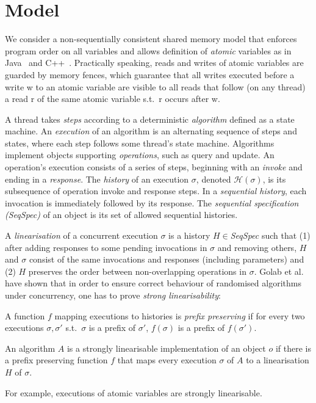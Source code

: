 \section{Model}
\label{sec:model}

We consider a non-sequentially consistent shared memory model that enforces program order on all variables and allows
definition of \emph{atomic} variables as in Java~\cite{JavaMemoryModel} and C++~\cite{CppConcurrentMemoryModel}.
Practically speaking, reads and writes of atomic variables are guarded by memory fences, which guarantee
that all writes executed before a write {\sc w} to an atomic variable are visible to all
reads that follow (on any thread) a read {\sc r} of the same atomic variable s.t.\ {\sc r} occurs after {\sc w}. 

A thread takes \emph{steps} according to a deterministic \emph{algorithm} defined as a state machine. 
An \emph{execution} of an algorithm is an alternating sequence of steps and states, 
where  each step follows some thread's state machine.
Algorithms implement objects supporting \emph{operations}, such as query and update. 
An operation's execution consists of a series of steps, beginning with an \emph{invoke} and ending in a \emph{response}. 
The \emph{history} of an execution $\sigma$, denoted ${\mathcal{H}}(\sigma)$, 
is its subsequence of operation invoke and response steps.
In a \emph{sequential history}, each invocation is immediately followed by its response.
The \emph{sequential specification (SeqSpec)} of an object is its set of allowed sequential histories.

A \emph{linearisation} of a concurrent execution $\sigma$ is a history $H \in$\emph{SeqSpec}
such that (1) after adding responses to some pending invocations in $\sigma$ and removing others,
$H$ and $\sigma$ consist of the same invocations and responses (including parameters)
and (2) $H$ preserves the order between non-overlapping operations in $\sigma$.
Golab et al.~\cite{Wojciech} have shown that in order to ensure
correct behaviour of randomised algorithms under concurrency,
one has to prove \emph{strong linearisability}:

\begin{definition}
A function $f$ mapping executions to  histories is \emph{prefix preserving} if
for every  two executions $\sigma, \sigma'$ s.t.\ $\sigma$ is a prefix of $\sigma'$,  
$f(\sigma)$ is a prefix of $f(\sigma')$.

An algorithm $A$ is a strongly linearisable implementation of an 
object $o$ if there is a prefix preserving function $f$ that maps 
every execution $\sigma$ of $A$ to a linearisation $H$ of $\sigma$.
\end{definition}

For example, executions of atomic variables are strongly linearisable.